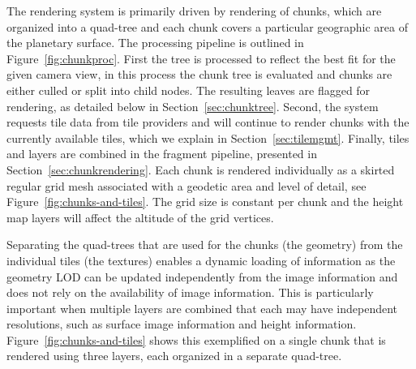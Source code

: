 \documentclass[journal]{vgtc}                %
\newcommand{\fig}[1]{Figure~\ref{fig:#1}}
\begin{document}
The rendering system is primarily driven by rendering of chunks, which are organized into a quad-tree and each chunk covers a particular geographic area of the planetary surface. The processing pipeline is outlined in \fig{chunkproc}. First the tree is processed to reflect the best fit for the given camera view, in this process the chunk tree is evaluated and chunks are either culled or split into child nodes. The resulting leaves are flagged for rendering, as detailed below in Section~\ref{sec:chunktree}. Second, the system requests tile data from tile providers and will continue to render chunks with the currently available tiles, which we explain in Section~\ref{sec:tilemgmt}. Finally, tiles and layers are combined in the fragment pipeline, presented in Section~\ref{sec:chunkrendering}.
Each chunk is rendered individually as a skirted regular grid mesh associated with a geodetic area and level of detail, see \fig{chunks-and-tiles}. The grid size is constant per chunk and the height map layers will affect the altitude of the grid vertices.


Separating the quad-trees that are used for the chunks (the geometry) from the individual tiles (the textures) enables a dynamic loading of information as the geometry LOD can be updated independently from the image information and does not rely on the availability of image information.
This is particularly important when multiple layers are combined that each may have independent resolutions, such as surface image information and height information.
\fig{chunks-and-tiles} shows this exemplified on a single chunk that is rendered using three layers, each organized in a separate quad-tree.
\end{document}
